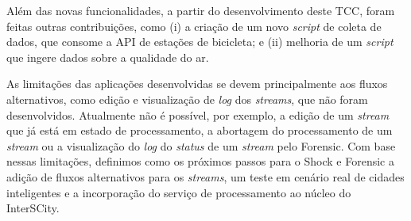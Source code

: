 Além das novas funcionalidades, a partir do desenvolvimento deste TCC, foram
feitas outras contribuições, como (i) a criação de um novo \textit{script} de
coleta de dados, que consome a API de estações de bicicleta; e (ii) melhoria 
de um \textit{script} que ingere dados sobre a qualidade do ar.

As limitações das aplicações desenvolvidas se devem principalmente aos fluxos
alternativos, como edição e visualização de \textit{log} dos \textit{streams},
que não foram desenvolvidos. Atualmente não é possível, por exemplo, a edição de
um \textit{stream} que já está em estado de processamento, a abortagem do
processamento de um \textit{stream} ou a visualização do \textit{log} do
\textit{status} de um \textit{stream} pelo Forensic. Com base nessas limitações,
definimos como os próximos passos para o Shock e Forensic a adição de fluxos
alternativos para os \textit{streams}, um teste em cenário real de cidades
inteligentes e a incorporação do serviço de processamento ao núcleo do
InterSCity.
